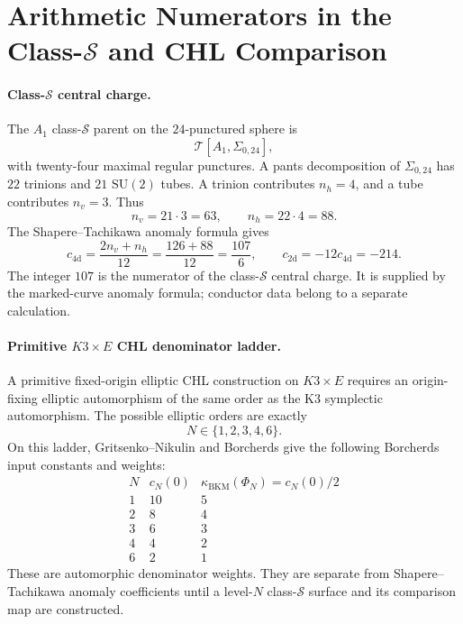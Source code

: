 
\section{Arithmetic Numerators in the Class-\texorpdfstring{$\mathcal{S}$}{S} and CHL Comparison}
\label{wn:sec:prime-rigidity-arithmetic}

\providecommand{\kBKM}{\kappa_{\mathrm{BKM}}}
\providecommand{\cfd}{c_{\mathrm{4d}}}
\providecommand{\ctd}{c_{\mathrm{2d}}}
\providecommand{\PhiN}{\Phi_N}
\providecommand{\WN}{W_N}
\providecommand{\Zmod}[1]{\mathbb{Z}/#1\mathbb{Z}}
\providecommand{\TclassS}[2]{\mathcal{T}[#1,#2]}

\paragraph{Class-\(\mathcal{S}\) central charge.}
The \(A_1\) class-\(\mathcal{S}\) parent on the \(24\)-punctured sphere is
\[
  \TclassS{A_1}{\Sigma_{0,24}},
\]
with twenty-four maximal regular punctures. A pants decomposition of
\(\Sigma_{0,24}\) has \(22\) trinions and \(21\) \(\mathrm{SU}(2)\)
tubes. A trinion contributes \(n_h=4\), and a tube contributes
\(n_v=3\). Thus
\[
  n_v=21\cdot 3=63,\qquad n_h=22\cdot 4=88.
\]
The Shapere--Tachikawa anomaly formula gives
\[
  \cfd
  =
  \frac{2n_v+n_h}{12}
  =
  \frac{126+88}{12}
  =
  \frac{107}{6},
  \qquad
  \ctd=-12\cfd=-214 .
\]
The integer \(107\) is the numerator of the class-\(\mathcal{S}\)
central charge. It is supplied by the marked-curve anomaly formula;
conductor data belong to a separate calculation.

\paragraph{Primitive \(K3\times E\) CHL denominator ladder.}
A primitive fixed-origin elliptic CHL construction on \(K3\times E\)
requires an origin-fixing elliptic automorphism of the same order as the
K3 symplectic automorphism. The possible elliptic orders are exactly
\[
  N\in\{1,2,3,4,6\}.
\]
On this ladder, Gritsenko--Nikulin and Borcherds give the following
Borcherds input constants and weights:
\[
  \begin{array}{c|cc}
    N & c_N(0) & \kBKM(\Phi_N)=c_N(0)/2 \\ \hline
    1 & 10 & 5 \\
    2 & 8  & 4 \\
    3 & 6  & 3 \\
    4 & 4  & 2 \\
    6 & 2  & 1
  \end{array}
\]
These are automorphic denominator weights. They are separate from
Shapere--Tachikawa anomaly coefficients until a level-\(N\)
class-\(\mathcal{S}\) surface and its comparison map are constructed.

